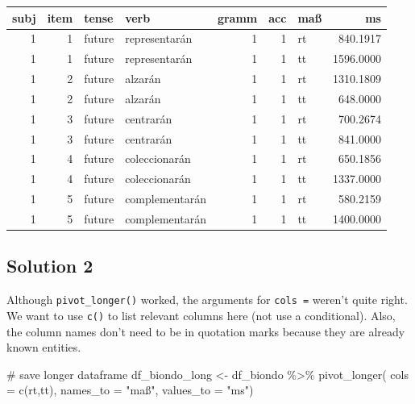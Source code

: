 \documentclass[
  letterpaper,
  DIV=11]{scrartcl}
\newenvironment{Shaded}{\begin{snugshade}}{\end{snugshade}}
\newcommand{\AttributeTok}[1]{\textcolor[rgb]{0.40,0.45,0.13}{#1}}
\newcommand{\CommentTok}[1]{\textcolor[rgb]{0.37,0.37,0.37}{#1}}
\newcommand{\FunctionTok}[1]{\textcolor[rgb]{0.28,0.35,0.67}{#1}}
\newcommand{\NormalTok}[1]{\textcolor[rgb]{0.00,0.23,0.31}{#1}}
\newcommand{\OtherTok}[1]{\textcolor[rgb]{0.00,0.23,0.31}{#1}}
\newcommand{\SpecialCharTok}[1]{\textcolor[rgb]{0.37,0.37,0.37}{#1}}
\newcommand{\StringTok}[1]{\textcolor[rgb]{0.13,0.47,0.30}{#1}}
\begin{document}
\begin{table}
\centering\begingroup\fontsize{20}{22}\selectfont

\begin{tabular}{r|r|l|l|r|r|l|r}
\hline
subj & item & tense & verb & gramm & acc & maß & ms\\
\hline
1 & 1 & future & representarán & 1 & 1 & rt & 840.1917\\
\hline
1 & 1 & future & representarán & 1 & 1 & tt & 1596.0000\\
\hline
1 & 2 & future & alzarán & 1 & 1 & rt & 1310.1809\\
\hline
1 & 2 & future & alzarán & 1 & 1 & tt & 648.0000\\
\hline
1 & 3 & future & centrarán & 1 & 1 & rt & 700.2674\\
\hline
1 & 3 & future & centrarán & 1 & 1 & tt & 841.0000\\
\hline
1 & 4 & future & coleccionarán & 1 & 1 & rt & 650.1856\\
\hline
1 & 4 & future & coleccionarán & 1 & 1 & tt & 1337.0000\\
\hline
1 & 5 & future & complementarán & 1 & 1 & rt & 580.2159\\
\hline
1 & 5 & future & complementarán & 1 & 1 & tt & 1400.0000\\
\hline
\end{tabular}
\endgroup{}
\end{table}

\subsection{Solution 2}

Although \texttt{pivot\_longer()} worked, the arguments for
\texttt{cols\ =} weren't quite right. We want to use \texttt{c()} to
list relevant columns here (not use a conditional). Also, the column
names don't need to be in quotation marks because they are already known
entities.

\begin{Shaded}
\begin{Highlighting}[numbers=left,,]
\CommentTok{\# save longer dataframe}
\NormalTok{df\_biondo\_long }\OtherTok{\textless{}{-}}\NormalTok{ df\_biondo }\SpecialCharTok{\%\textgreater{}\%} 
  \FunctionTok{pivot\_longer}\NormalTok{(}
    \AttributeTok{cols =} \FunctionTok{c}\NormalTok{(rt,tt),}
    \AttributeTok{names\_to =} \StringTok{"maß"}\NormalTok{,}
    \AttributeTok{values\_to =} \StringTok{"ms"}\NormalTok{)}
\end{Highlighting}
\end{Shaded}
\end{document}

